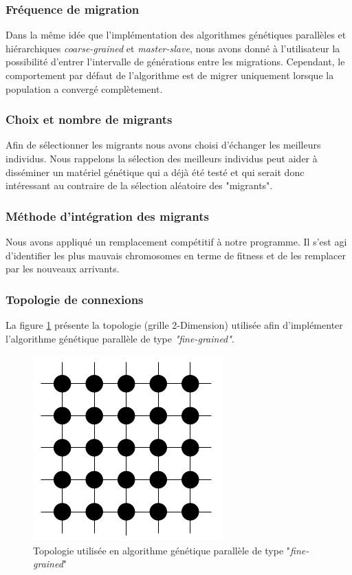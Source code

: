 	\subsubsection{Fréquence de migration}
	
	\hspace*{.5cm} Dans la même idée que l'implémentation des algorithmes génétiques parallèles et hiérarchiques \emph{coarse-grained} et \emph{master-slave}, nous avons donné à l'utilisateur la possibilité d'entrer l'intervalle de générations entre les migrations. Cependant, le comportement par défaut de l'algorithme est de migrer uniquement lorsque la population a convergé complètement.  
	
	\subsubsection{Choix et nombre de migrants}
	 Afin de sélectionner les migrants nous avons choisi d'échanger les meilleurs individus. Nous rappelons la sélection des meilleurs individus peut aider à disséminer un matériel génétique qui a déjà été testé et qui serait donc intéressant au contraire de la sélection aléatoire des "migrants".
	
	\subsubsection{Méthode d'intégration des migrants}
 	
 	Nous avons appliqué un remplacement compétitif à notre programme. Il s'est agi d'identifier les plus mauvais chromosomes en terme de fitness et de les remplacer par les nouveaux arrivants.
	
	\subsubsection{Topologie de connexions}
	
	La figure \ref{fig:fine_grained_fig} présente la topologie (grille 2-Dimension) utilisée afin d'implémenter l'algorithme génétique parallèle de type \emph{"fine-grained"}.
	
	\begin{figure}[!h]
		\begin{center}
			\includegraphics[scale=.3]{images/fine_grained_fig.png}
			\caption{Topologie utilisée en algorithme génétique parallèle de type "\emph{fine-grained}" \cite{cant2}}
			\label{fig:fine_grained_fig}
		\end{center}
	\end{figure} 
	
